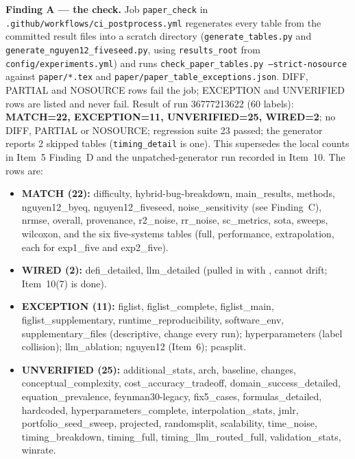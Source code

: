 \documentclass[11pt]{article}
\begin{document}
\textbf{Finding A --- the check.} Job \texttt{paper\_check} in \texttt{.github/workflows/ci\_postprocess.yml}
regenerates every table from the committed result files into a scratch directory
(\texttt{generate\_tables.py} and \texttt{generate\_nguyen12\_fiveseed.py}, using \texttt{results\_root} from
\texttt{config/experiments.yml}) and runs \texttt{check\_paper\_tables.py --strict-nosource} against
\texttt{paper/*.tex} and \texttt{paper/paper\_table\_exceptions.json}. DIFF, PARTIAL and NOSOURCE rows fail the job;
EXCEPTION and UNVERIFIED rows are listed and never fail. Result of run 36777213622 (60 labels):
\textbf{MATCH=22, EXCEPTION=11, UNVERIFIED=25, WIRED=2}; no DIFF, PARTIAL or NOSOURCE; regression suite 23 passed;
the generator reports 2 skipped tables (\texttt{timing\_detail} is one). This supersedes the local counts in Item~5
Finding~D and the unpatched-generator run recorded in Item~10. The rows are:
\begin{itemize}\small
\item \textbf{MATCH (22):} difficulty, hybrid-bug-breakdown, main\_results, methods, nguyen12\_byeq,
  nguyen12\_fiveseed, noise\_sensitivity (see Finding~C), nrmse, overall, provenance, r2\_noise, rr\_noise,
  sc\_metrics, sota, sweeps, wilcoxon, and the six five-systems tables (full, performance, extrapolation, each for
  exp1\_five and exp2\_five).
\item \textbf{WIRED (2):} defi\_detailed, llm\_detailed (pulled in with \verb||, cannot drift; Item~10(7) is done).
\item \textbf{EXCEPTION (11):} figlist, figlist\_complete, figlist\_main, figlist\_supplementary,
  runtime\_reproducibility, software\_env, supplementary\_files (descriptive, change every run); hyperparameters
  (label collision); llm\_ablation; nguyen12 (Item~6); pcasplit.
\item \textbf{UNVERIFIED (25):} additional\_stats, arch, baseline, changes, conceptual\_complexity,
  cost\_accuracy\_tradeoff, domain\_success\_detailed, equation\_prevalence, feynman30-legacy, fix5\_cases,
  formulas\_detailed, hardcoded, hyperparameters\_complete, interpolation\_stats, jmlr, portfolio\_seed\_sweep,
  projected, randomsplit, scalability, time\_noise, timing\_breakdown, timing\_full, timing\_llm\_routed\_full,
  validation\_stats, winrate.
\end{itemize}
\end{document}
